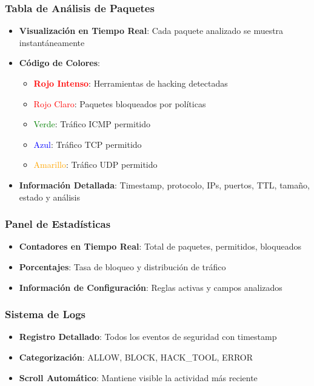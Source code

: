 \documentclass[12pt,a4paper]{article}
\begin{document}
\subsubsection{Tabla de Análisis de Paquetes}
\begin{itemize}
    \item \textbf{Visualización en Tiempo Real}: Cada paquete analizado se muestra instantáneamente
    \item \textbf{Código de Colores}:
    \begin{itemize}
        \item \textcolor{red}{\textbf{Rojo Intenso}}: Herramientas de hacking detectadas
        \item \textcolor{red}{Rojo Claro}: Paquetes bloqueados por políticas
        \item \textcolor{green}{Verde}: Tráfico ICMP permitido
        \item \textcolor{blue}{Azul}: Tráfico TCP permitido
        \item \textcolor{orange}{Amarillo}: Tráfico UDP permitido
    \end{itemize}
    \item \textbf{Información Detallada}: Timestamp, protocolo, IPs, puertos, TTL, tamaño, estado y análisis
\end{itemize}

\subsubsection{Panel de Estadísticas}
\begin{itemize}
    \item \textbf{Contadores en Tiempo Real}: Total de paquetes, permitidos, bloqueados
    \item \textbf{Porcentajes}: Tasa de bloqueo y distribución de tráfico
    \item \textbf{Información de Configuración}: Reglas activas y campos analizados
\end{itemize}

\subsubsection{Sistema de Logs}
\begin{itemize}
    \item \textbf{Registro Detallado}: Todos los eventos de seguridad con timestamp
    \item \textbf{Categorización}: ALLOW, BLOCK, HACK\_TOOL, ERROR
    \item \textbf{Scroll Automático}: Mantiene visible la actividad más reciente
\end{itemize}
\end{document}
